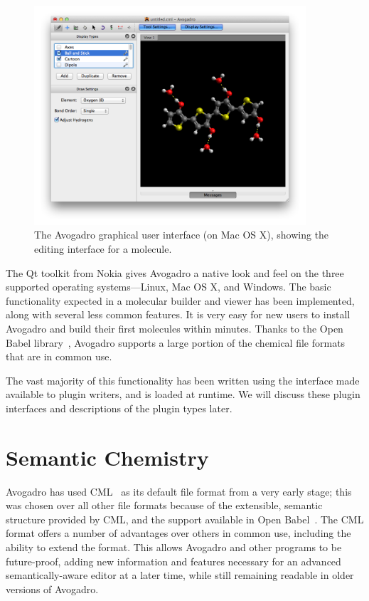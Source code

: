 \documentclass[10pt]{bmc_article}
\newenvironment{bmcformat}{\begin{raggedright}
\baselineskip20pt\sloppy\setboolean{publ}{false}}{\end{raggedright}
\baselineskip20pt\sloppy}
\begin{document}
\begin{bmcformat}
\begin{figure}
  \begin{center}
    \includegraphics[width=0.9\textwidth]{images/avogadro-drawing}
  \end{center}
  \caption{The Avogadro graphical user interface (on Mac OS X), showing the
editing interface
for a molecule.}
  \label{f:avogadrogui}
\end{figure}

The Qt toolkit from Nokia gives Avogadro a native look and feel on the three
supported operating systems---Linux, Mac OS X, and Windows. The basic
functionality expected in a molecular builder and viewer has been implemented,
along with several less common features. It is very easy for new users to
install Avogadro and build their
first molecules within minutes. Thanks to the Open Babel library~\cite{OpenBabel}, Avogadro
supports a large portion of the chemical file formats that are in
common use.

The vast majority of this functionality has been written using the
interface made available to plugin writers, and is loaded at
runtime. We will discuss these plugin interfaces and descriptions of
the plugin types later.

\section{Semantic Chemistry}

Avogadro has used CML~\cite{CML2011a, CML2011b} as its default file format from
a very early stage; this
was chosen over all other file formats because of the extensible,
semantic structure provided by CML, and the support available in Open Babel~\cite{OpenBabel}. The CML
format offers a number of advantages over others in common use, including the
ability to extend the format. This allows Avogadro and other programs
to be future-proof, adding new information and features
necessary for an advanced semantically-aware editor at a later time,
while still remaining readable in older versions of Avogadro.


\end{bmcformat}
\end{document}
